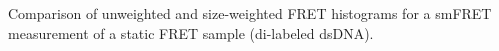 \label{fig:weight_fret_meas} Comparison of unweighted and size-weighted FRET histograms for a smFRET measurement of a static FRET sample (di-labeled dsDNA).